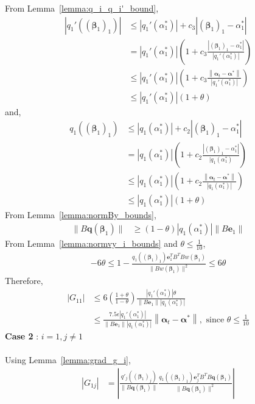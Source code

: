 \documentclass[letterpaper]{article}
\newcommand{\bas}[1]{\begin{align*}#1\end{align*}}
\newcommand{\balpha}{\pmb{\alpha}}
\newcommand{\be}{\pmb{e}}
\newcommand{\bbeta}{\pmb{\beta}}
\newcommand{\bq}{\pmb{q}}
\newcommand{\norm}[1]{\left\|#1\right\|}
\newcommand{\bb}[1]{\left(#1\right)}
\begin{document}
From Lemma~\ref{lemma:q_i_q_i'_bound}, 
\bas{
    \left|q_{1}'\bb{\bb{\bbeta_{1}}_{1}}\right| &\leq \left|q_{1}'\bb{\alpha^{*}_{1}}\right| + c_{3}\left|\bb{\bbeta_{1}}_{1} - \alpha^{*}_{1}\right| \\ 
    &= \left|q_{1}'\bb{\alpha^{*}_{1}}\right|\bb{1 + c_{3}\frac{\left|\bb{\bbeta_{1}}_{1} - \alpha^{*}_{1}\right|}{\left|q_{1}'\bb{\alpha^{*}_{1}}\right|}} \\
    &\leq \left|q_{1}'\bb{\alpha^{*}_{1}}\right|\bb{1 + c_{3}\frac{\norm{\balpha_{t}-\balpha^{*}}}{\left|q_{1}'\bb{\alpha^{*}_{1}}\right|}} \\
    &\leq \left|q_{1}'\bb{\alpha^{*}_{1}}\right|\bb{1 + \theta}
}
and,
\bas{
    q_{1}\bb{\bb{\bbeta_{1}}_{1}} &\leq |q_{1}\bb{\alpha^{*}_{1}}| + c_{2}\left|\bb{\bbeta_{1}}_{1} - \alpha^{*}_{1}\right| \\ 
    &= |q_{1}\bb{\alpha^{*}_{1}}|\bb{1 + c_{2}\frac{\left|\bb{\bbeta_{1}}_{1} - \alpha^{*}_{1}\right|}{|q_{1}\bb{\alpha^{*}_{1}}}} \\
    &\leq |q_{1}\bb{\alpha^{*}_{1}}|\bb{1 + c_{2}\frac{\norm{\balpha_{t}-\balpha^{*}}}{|q_{1}\bb{\alpha^{*}_{1}}|}} \\
    &\leq |q_{1}\bb{\alpha^{*}_{1}}|\bb{1 + \theta}
}
From Lemma~\ref{lemma:normBy_bounds}, 
\bas{
    \|B \bq\bb{\bbeta_{1}}\| &\geq \bb{1-\theta}\left|q_{1}\bb{\alpha^{*}_{1}}\right|\left\|B\be_{1}\right\|
}
From Lemma~\ref{lemma:normvy_i_bounds} and $\theta \leq \frac{1}{10}$,
\bas{
    -6\theta \leq 1 - \frac{q_{1}\bb{\bb{\bbeta_{1}}_{1}}\be_{1}^{T}B^{T}Bw\bb{\bbeta_{1}}}{\|Bw\bb{\bbeta_{1}}\|^{2}} \leq 6\theta
}
Therefore,
\bas{
    \left|G_{11}\right| &\leq 6\bb{\frac{1 + \theta}{1 - \theta}}\frac{\left|q_{1}'\bb{\alpha^{*}_{1}}\right|\theta}{\|B\be_{1}\|\left|q_{1}\bb{\alpha^{*}_{1}}\right|} \\ 
    &\leq \frac{7.5\epsilon \left|q_{1}'\bb{\alpha^{*}_{1}}\right|}{\|B\be_{1}\|\left|q_{1}\bb{\alpha^{*}_{1}}\right|}\left\|\balpha_{t}-\balpha^{*}\right\|, \text{ since } \theta \leq \frac{1}{10} 
}
\textbf{Case 2} : $i=1, j \neq 1$ \\ \\ 
Using Lemma~\ref{lemma:grad_g_i},
\bas{
    \left|G_{1j}\right| &= \left|\frac{q'_{j}\bb{\bb{\bbeta_{1}}_{j}}}{\|B\bq\bb{\bbeta_{1}}\|}\frac{q_{1}\bb{\bb{\bbeta_{1}}_{1}}\be_{j}^{T}B^{T}B\bq\bb{\bbeta_{1}}}{\|B\bq\bb{\bbeta_{1}}\|^{2}}\right|
}
\end{document}
